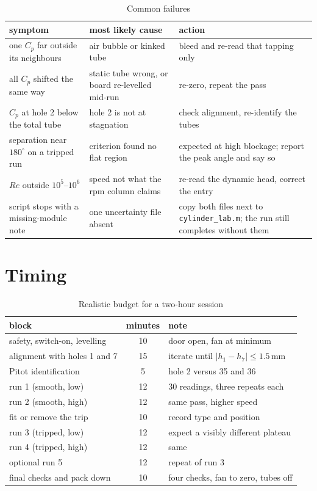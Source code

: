 \documentclass[11pt,a4paper]{article}
\newcommand{\Cp}{\ensuremath{C_p}}
\newcommand{\ReD}{\ensuremath{\mathit{Re}}}
\begin{document}
\begin{table}[H]
\centering
\caption{Common failures}
\small
\begin{tabularx}{\textwidth}{@{}p{5.2cm} X p{5.4cm}@{}}
\toprule
symptom & most likely cause & action \\
\midrule
one \Cp{} far outside its neighbours & air bubble or kinked tube & bleed and re-read that tapping only \\
all \Cp{} shifted the same way & static tube wrong, or board re-levelled mid-run & re-zero, repeat the pass \\
\Cp{} at hole 2 below the total tube & hole 2 is not at stagnation & check alignment, re-identify the tubes \\
separation near $180^\circ$ on a tripped run & criterion found no flat region &
expected at high blockage; report the peak angle and say so \\
\ReD{} outside $10^5$--$10^6$ & speed not what the rpm column claims & re-read the dynamic head, correct the entry \\
script stops with a missing-module note & one uncertainty file absent & copy both files next to
\texttt{cylinder\_lab.m}; the run still completes without them \\
\bottomrule
\end{tabularx}
\end{table}

\section{Timing}

\begin{table}[H]
\centering
\caption{Realistic budget for a two-hour session}
\small
\begin{tabularx}{\textwidth}{@{}X c p{7.4cm}@{}}
\toprule
block & minutes & note \\
\midrule
safety, switch-on, levelling & 10 & door open, fan at minimum \\
alignment with holes 1 and 7 & 15 & iterate until $|h_1 - h_7| \leq 1.5$\,mm \\
Pitot identification & 5 & hole 2 versus 35 and 36 \\
run 1 (smooth, low) & 12 & 30 readings, three repeats each \\
run 2 (smooth, high) & 12 & same pass, higher speed \\
fit or remove the trip & 10 & record type and position \\
run 3 (tripped, low) & 12 & expect a visibly different plateau \\
run 4 (tripped, high) & 12 & same \\
optional run 5 & 12 & repeat of run 3 \\
final checks and pack down & 10 & four checks, fan to zero, tubes off \\
\bottomrule
\end{tabularx}
\end{table}
\end{document}
